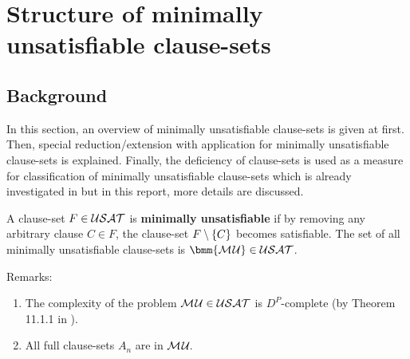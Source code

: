 \documentclass{report}
\begin{document}
\chapter{Structure of minimally unsatisfiable clause-sets}
\label{cha:mucls}

\section{Background}
\label{sec:basicdef}

In this section, an overview of minimally unsatisfiable clause-sets is given at first. Then, special reduction/extension with application for minimally unsatisfiable clause-sets is explained. Finally, the deficiency of clause-sets is used as a measure for classification of minimally unsatisfiable clause-sets which is already investigated in \cite{KullmannZhao2010Extremal, Kullmann2007HandbuchMU, KullmannZhao2016UHitSAT, KleineBuening2000SubclassesMU, Ku99dK} but in this report, more details are discussed.

\begin{defi}\label{def:mu}
A clause-set $F \in \mathcal{USAT}$ is \textbf{minimally unsatisfiable} if by removing any arbitrary clause $C \in F$, the clause-set $F \setminus \{ C \}$ becomes satisfiable. The set of all minimally unsatisfiable clause-sets is $\bmm{\Musat} \in \Usat$.
\end{defi}
Remarks:
  \begin{enumerate}
  \item The complexity of the problem $\mathcal{M\hspace{0.8pt}U} \in \mathcal{USAT}$ is $D^P$-complete (by Theorem 11.1.1 in \cite{Kullmann2007HandbuchMU}).
  \item All full clause-sets $ A_n$ are in $\mathcal{M\hspace{0.8pt}U}_{\!}$.
  \end{enumerate}
\end{document}

